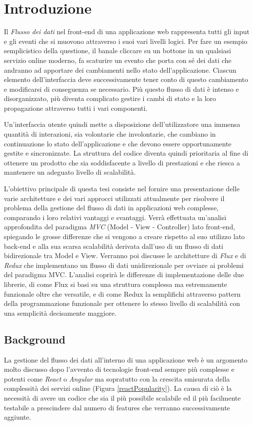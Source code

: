 \chapter{Introduzione}
Il \textit{Flusso dei dati} nel front-end di una applicazione web rappresenta tutti gli input e gli eventi che si muovono attraverso i suoi vari livelli logici. Per fare un esempio semplicistico della questione, il banale cliccare su un bottone in un qualsiasi servizio online moderno, fa scaturire un evento che porta con sé dei dati che andranno ad apportare dei cambiamenti nello stato dell'applicazione. Ciascun elemento dell'interfaccia deve successivamente tener conto di questo cambiamento e modificarsi di conseguenza se necessario. Più questo flusso di dati è intenso e disorganizzato, più diventa complicato gestire i cambi di stato e la loro propagazione attraverso tutti i vari componenti.

Un'interfaccia utente quindi mette a disposizione dell'utilizzatore una immensa quantità di interazioni, sia volontarie che involontarie, che cambiano in continuazione lo stato dell'applicazione e che devono essere opportunamente gestite e sincronizzate. La struttura del codice diventa quindi prioritaria al fine di ottenere un prodotto che sia soddisfacente a livello di prestazioni e che riesca a mantenere un adeguato livello di scalabilità.

L'obiettivo principale di questa tesi consiste nel fornire una presentazione delle varie architetture e dei vari approcci utilizzati attualmente per risolvere il problema della gestione del flusso di dati in applicazioni web complesse, comparando i loro relativi vantaggi e svantaggi. Verrà effettuata un'analisi approfondita del paradigma \textit{MVC} (Model - View - Controller) lato front-end, spiegando le grosse differenze che si vengono a creare rispetto al suo utilizzo lato back-end e alla sua scarsa scalabilità derivata dall'uso di un flusso di dati bidirezionale tra Model e View. Verranno poi discusse le architetture di \textit{Flux} e di \textit{Redux} che implementano un flusso di dati unidirezionale per ovviare ai problemi del paradigma MVC.
L'analisi coprirà le differenze di implementazione delle due librerie, di come Flux si basi su una struttura complessa ma estremamente funzionale oltre che versatile, e di come Redux la semplifichi attraverso pattern della programmazione funzionale per ottenere lo stesso livello di scalabilità con una semplicità decisamente maggiore.

\section{Background}
La gestione del flusso dei dati all'interno di una applicazione web è un argomento molto discusso dopo l'avvento di tecnologie front-end sempre più complesse e potenti come \textit{React} o \textit{Angular} ma sopratutto con la crescita smisurata della complessità dei servizi online (Figura \ref{reactPopularity}). La causa di ciò è la necessità di avere un codice che sia il più possibile scalabile ed il più facilmente testabile a prescindere dal numero di features che verranno successivamente aggiunte. 

